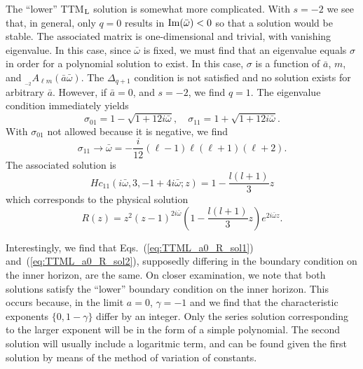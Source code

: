 \documentclass[11pt]{article}
\newcommand{\scA}[4][]{{}_{{}_{#2}}A^{#1}_{#3}(#4)}
\begin{document}
The ``lower'' TTM${}_{\rm{L}}$ solution is somewhat more complicated.
With $s=-2$ we see that, in general, only $q=0$ results in
$\rm{Im}(\bar\omega)<0$ so that a solution would be stable.  The
associated matrix is one-dimensional and trivial, with vanishing
eigenvalue.  In this case, since $\bar\omega$ is fixed, we must find
that an eigenvalue equals $\sigma$ in order for a polynomial solution
to exist.  In this case, $\sigma$ is a function of $\bar{a}$, $m$, and
$\scA{-2}{\ell{m}}{\bar{a}\bar\omega}$.  The $\Delta_{q+1}$ condition
is not satisfied and no solution exists for arbitrary $\bar{a}$.  However,
if $\bar{a}=0$, and $s=-2$, we find $q=1$.  The eigenvalue condition
immediately yields
\begin{equation}
\sigma_{01}=1-\sqrt{1+12i\bar\omega},\quad
\sigma_{11}=1+\sqrt{1+12i\bar\omega}.
\end{equation}
With $\sigma_{01}$ not allowed because it is negative, we find
\begin{equation}
   \sigma_{11}\to\bar\omega =-\frac{i}{12}(\ell-1)\ell(\ell+1)(\ell+2).
\end{equation}
The associated solution is
\begin{equation}\label{eq:TTML_a0_H_sol2}
  Hc_{11}(i\bar\omega,3,-1+4i\bar\omega;z) = 1-\frac{l(l+1)}3z
\end{equation}
which corresponds to the physical solution
\begin{equation}\label{eq:TTML_a0_R_sol2}
  R(z) = z^2(z-1)^{2i\bar\omega}\left(1-\frac{l(l+1)}3z\right)e^{2i\bar\omega z}.
\end{equation}

Interestingly, we find that Eqs.~(\ref{eq:TTML_a0_R_sol1})
and~(\ref{eq:TTML_a0_R_sol2}), supposedly differing in the boundary
condition on the inner horizon, are the same.  On closer examination,
we note that both solutions satisfy the ``lower'' boundary condition
on the inner horizon.  This occurs because, in the limit $a=0$,
$\gamma=-1$ and we find that the characteristic exponents
$\{0,1-\gamma\}$ differ by an integer.  Only the series solution
  corresponding to the larger exponent will be in the form of a simple
  polynomial.  The second solution will usually include a logaritmic term,
  and can be found given the first solution by means of the method of 
variation of constants.
\end{document}
